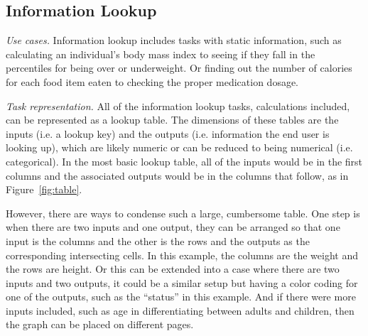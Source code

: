 \documentclass{sig-alternate}
\begin{document}

\subsection{Information Lookup}
\label{sec:lookup}

\emph{Use cases.}
Information lookup includes tasks with static information, such as calculating an individual's body mass index to seeing if they fall in the percentiles for being over or underweight. Or finding out the number of calories for each food item eaten to checking the proper medication dosage.

\emph{Task representation.}
All of the information lookup tasks, calculations included, can be represented as a lookup table. 
The dimensions of these tables are the inputs (i.e. a lookup key) and the outputs (i.e. information the end user is looking up), which are likely numeric or can be reduced to being numerical (i.e. categorical). In the most basic lookup table, all of the inputs would be in the first columns and the associated outputs would be in the columns that follow, as in Figure~\ref{fig:table}.

However, there are ways to condense such a large, cumbersome table.
One step is when there are two inputs and one output, they can be arranged so that one input is the columns and the other is the rows and the outputs as the corresponding intersecting cells. In this example, the columns are the weight and the rows are height. Or this can be extended into a case where there are two inputs and two outputs, it could be a similar setup but having a color coding for one of the outputs, such as the ``status'' in this example. And if there were more inputs included, such as age in differentiating between adults and children, then the graph can be placed on different pages.
\end{document}

